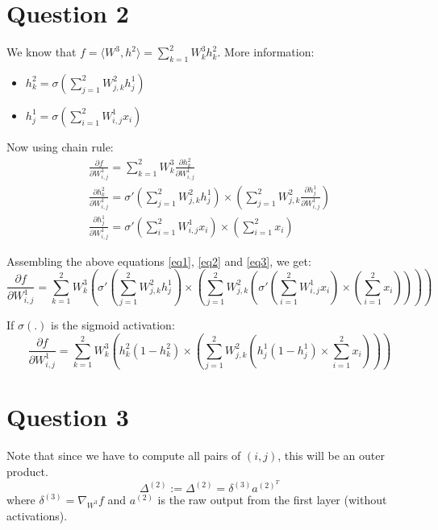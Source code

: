 \documentclass{article}
\newcommand{\dO}{\partial}
\begin{document}
\section*{Question 2}
\begin{flushleft}
We know that \(f = \langle W^{3}, h^{2} \rangle = \displaystyle \sum_{k=1}^{2} W^{3}_{k}h^{2}_{k}\).
More information:
\begin{itemize}
\item \(\displaystyle h^{2}_{k} = \sigma\left(\sum_{j=1}^{2} W^{2}_{j, k} h^{1}_{j}\right) \)
\item \(\displaystyle h^{1}_{j} = \sigma\left(\sum_{i=1}^{2} W^{1}_{i, j} x_{i}\right) \)
\end{itemize}
Now using chain rule:
\begin{gather}
\label{eq1}
\displaystyle \frac{\dO f}{\dO W^{1}_{i, j}} = \sum_{k=1}^{2}W^{3}_{k}\frac{\dO h^{2}_{k}}{\dO W^{1}_{i, j}} \\
\label{eq2}
\displaystyle \frac{\dO h^{2}_{k}}{\dO W^{1}_{i, j}} = \sigma'\left(\sum_{j=1}^{2} W^{2}_{j,k}h^{1}_{j}\right) \times \left(\sum_{j=1}^{2}W^{2}_{j,k}\frac{\dO h^{1}_{j}}{\dO W^{1}_{i, j}}\right) \\
\label{eq3}
\displaystyle \frac{\dO h^{1}_{j}}{\dO W^{1}_{i, j}} = \sigma'\left(\sum_{i=1}^{2} W^{1}_{i,j}x_{i}\right) \times \left(\sum_{i=1}^{2}x_{i}\right)
\end{gather}

Assembling the above equations \ref{eq1}, \ref{eq2} and \ref{eq3}, we get:
\begin{equation}
\displaystyle \frac{\dO f}{\dO W^{1}_{i,j}} = \sum_{k=1}^{2}W^{3}_{k}\left(\sigma'\left(\sum_{j=1}^{2} W^{2}_{j,k}h^{1}_{j}\right) \times \left(\sum_{j=1}^{2}W^{2}_{j, k} \left(\sigma'\left(\sum_{i=1}^{2} W^{1}_{i,j}x_{i}\right) \times \left(\sum_{i=1}^{2}x_{i}\right)\right) \right) \right)
\end{equation}

If \(\sigma(.)\) is the sigmoid activation:
\begin{equation}
\displaystyle \frac{\dO f}{\dO W^{1}_{i, j}} = \sum_{k=1}^{2}W^{3}_{k} \left(h^{2}_{k} (1 - h^{2}_{k}) \times \left(\sum_{j=1}^{2} W^{2}_{j,k} \left(h^{1}_{j} (1 - h^{1}_{j}) \times \sum_{i=1}^{2} x_{i}\right) \right)\right)
\end{equation}
\end{flushleft}

\section*{Question 3}
\begin{flushleft}
Note that since we have to compute all pairs of \((i, j)\), this will be an outer product.
\begin{equation}
\Delta^{(2)} := \Delta^{(2)} = \delta^{(3)} a^{(2)^{T}}
\end{equation}
where \(\delta^{(3)} = \nabla_{W^{3}} f\) and \(a^{(2)}\) is the raw output from the first layer (without activations).
\end{flushleft}
\end{document}
